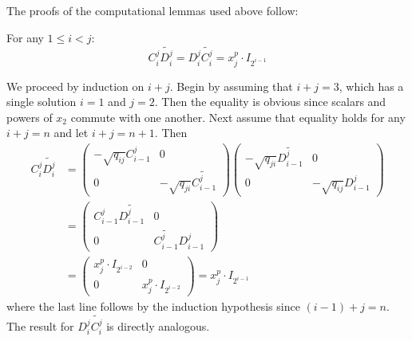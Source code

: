 \documentclass[12pt]{article}
\begin{document}
    The proofs of the computational lemmas used above follow:
    \begin{lem}\label{lem:monomial}
        For any $1\le i<j$:
        \[C_i^j\widetilde{D_i^j}=D_i^j\widetilde{C_i^j}=x_j^p\cdot I_{2^{i-1}}\]
    \end{lem}
    \begin{prf}
    We proceed by induction on $i+j$. Begin by assuming that $i+j=3$, which has a single solution $i=1$ and $j=2$. Then the equality is obvious since scalars and powers of $x_2$ commute with one another. Next assume that equality holds for any $i+j=n$ and let $i+j=n+1.$ Then
    \begin{align*}
        C_i^j\widetilde{D_i^j} &=\begin{pmatrix}-\sqrt{q_{ij}}C_{i-1}^j & 0\\0 & -\sqrt{q_{ji}}\widetilde{C_{i-1}^j}\end{pmatrix}\begin{pmatrix}-\sqrt{q_{ji}}\widetilde{D_{i-1}^j} & 0\\0 & -\sqrt{q_{ij}}D_{i-1}^j\end{pmatrix}\\
        &=\begin{pmatrix}C_{i-1}^j\widetilde{D_{i-1}^j} & 0 \\ 0 & \widetilde{C_{i-1}^j}D_{i-1}^j\end{pmatrix}\\
        &=\begin{pmatrix}x_j^p\cdot I_{2^{i-2}} & 0\\0 & x_j^p\cdot I_{2^{i-2}}\end{pmatrix}=x_j^p\cdot I_{2^{i-1}}
    \end{align*}
    where the last line follows by the induction hypothesis since $(i-1)+j = n.$ The result for $D_i^j\widetilde{C_i^j}$ is directly analogous.
    \end{prf}
    
\end{document}
